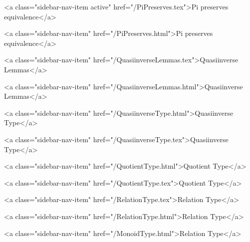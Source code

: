       
        
          <a class="sidebar-nav-item active" href="/PiPreserves.tex">Pi preserves equivalence</a>
        
      
    
      
        
          <a class="sidebar-nav-item" href="/PiPreserves.html">Pi preserves equivalence</a>
        
      
    
      
        
          <a class="sidebar-nav-item" href="/QuasiinverseLemmas.tex">Quasiinverse Lemmas</a>
        
      
    
      
        
          <a class="sidebar-nav-item" href="/QuasiinverseLemmas.html">Quasiinverse Lemmas</a>
        
      
    
      
        
          <a class="sidebar-nav-item" href="/QuasiinverseType.html">Quasiinverse Type</a>
        
      
    
      
        
          <a class="sidebar-nav-item" href="/QuasiinverseType.tex">Quasiinverse Type</a>
        
      
    
      
        
          <a class="sidebar-nav-item" href="/QuotientType.html">Quotient Type</a>
        
      
    
      
        
          <a class="sidebar-nav-item" href="/QuotientType.tex">Quotient Type</a>
        
      
    
      
        
          <a class="sidebar-nav-item" href="/RelationType.tex">Relation Type</a>
        
      
    
      
        
          <a class="sidebar-nav-item" href="/RelationType.html">Relation Type</a>
        
      
    
      
        
          <a class="sidebar-nav-item" href="/MonoidType.html">Relation Type</a>
        
